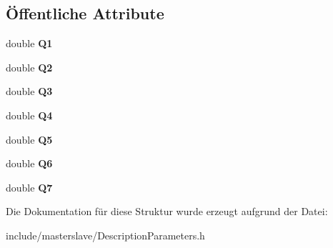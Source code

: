 \subsection*{Öffentliche Attribute}
\begin{DoxyCompactItemize}
\item 
\hypertarget{structlbrJointAngles_a18069e0505c332f0be822ae6bbfad263}{double {\bfseries Q1}}\label{structlbrJointAngles_a18069e0505c332f0be822ae6bbfad263}

\item 
\hypertarget{structlbrJointAngles_a5e25dfb7253b5cef4c4d6116eab50f19}{double {\bfseries Q2}}\label{structlbrJointAngles_a5e25dfb7253b5cef4c4d6116eab50f19}

\item 
\hypertarget{structlbrJointAngles_a2b8455d90c29b5fbfc5bea327b70d997}{double {\bfseries Q3}}\label{structlbrJointAngles_a2b8455d90c29b5fbfc5bea327b70d997}

\item 
\hypertarget{structlbrJointAngles_aa0203dcf13361ce8db6d8c6d3a6ffba0}{double {\bfseries Q4}}\label{structlbrJointAngles_aa0203dcf13361ce8db6d8c6d3a6ffba0}

\item 
\hypertarget{structlbrJointAngles_a74d22803618cfb8ed2c1aac61d72a368}{double {\bfseries Q5}}\label{structlbrJointAngles_a74d22803618cfb8ed2c1aac61d72a368}

\item 
\hypertarget{structlbrJointAngles_a1565744be30b2b453bd8f1b44216732e}{double {\bfseries Q6}}\label{structlbrJointAngles_a1565744be30b2b453bd8f1b44216732e}

\item 
\hypertarget{structlbrJointAngles_acc334be5fb62073fc40a7b188fbc44cc}{double {\bfseries Q7}}\label{structlbrJointAngles_acc334be5fb62073fc40a7b188fbc44cc}

\end{DoxyCompactItemize}


Die Dokumentation für diese Struktur wurde erzeugt aufgrund der Datei\-:\begin{DoxyCompactItemize}
\item 
include/masterslave/Description\-Parameters.\-h\end{DoxyCompactItemize}
